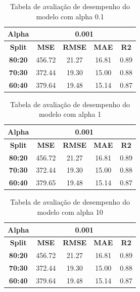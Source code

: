 \begin{table}[H]
\centering
\begin{tabular}{|c|c|c|c|c|}
\hline
\textbf{Alpha} & \multicolumn{4}{|c|}{\textbf{0.001}} \\
\hline
\textbf{Split} & \textbf{MSE} & \textbf{RMSE} & \textbf{MAE} & \textbf{R2} \\
\hline
\textbf{80:20} & 456.72 & 21.27 & 16.81 & 0.89 \\
\textbf{70:30} & 372.44 & 19.30 & 15.00 & 0.88 \\
\textbf{60:40} & 379.64 & 19.48 & 15.14 & 0.87 \\
\hline
\end{tabular}
\caption{Tabela de avaliação de desempenho do modelo com alpha 0.1}
\label{tab:avaliacao_alpha_0_1}
\end{table}

\begin{table}[H]
\centering
\begin{tabular}{|c|c|c|c|c|}
\hline
\textbf{Alpha} & \multicolumn{4}{|c|}{\textbf{0.001}} \\
\hline
\textbf{Split} & \textbf{MSE} & \textbf{RMSE} & \textbf{MAE} & \textbf{R2} \\
\hline
\textbf{80:20} & 456.72 & 21.27 & 16.81 & 0.89 \\
\textbf{70:30} & 372.44 & 19.30 & 15.00 & 0.88 \\
\textbf{60:40} & 379.65 & 19.48 & 15.14 & 0.87 \\
\hline
\end{tabular}
\caption{Tabela de avaliação de desempenho do modelo com alpha 1}
\label{tab:avaliacao_alpha_1}
\end{table}

\begin{table}[H]
\centering
\begin{tabular}{|c|c|c|c|c|}
\hline
\textbf{Alpha} & \multicolumn{4}{|c|}{\textbf{0.001}} \\
\hline
\textbf{Split} & \textbf{MSE} & \textbf{RMSE} & \textbf{MAE} & \textbf{R2} \\
\hline
\textbf{80:20} & 456.72 & 21.27 & 16.81 & 0.89 \\
\textbf{70:30} & 372.44 & 19.30 & 15.00 & 0.88 \\
\textbf{60:40} & 379.64 & 19.48 & 15.14 & 0.87 \\
\hline
\end{tabular}
\caption{Tabela de avaliação de desempenho do modelo com alpha 10}
\label{tab:avaliacao_alpha_10}
\end{table}

